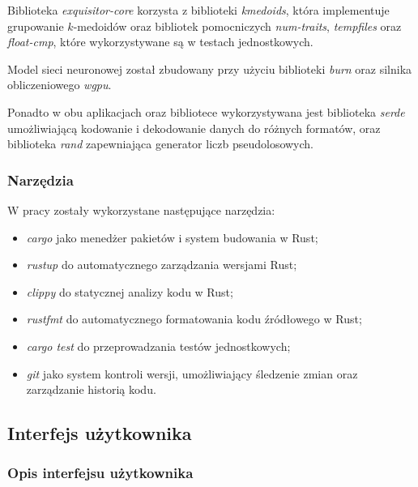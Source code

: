             Biblioteka \textit{exquisitor-core} korzysta z biblioteki \textit{kmedoids}\cite{Schubert:2022}, która implementuje grupowanie $k$-medoidów oraz bibliotek pomocniczych \textit{num-traits}, \textit{tempfiles} oraz \textit{float-cmp}, które wykorzystywane są w testach jednostkowych.

            Model sieci neuronowej został zbudowany przy użyciu biblioteki \textit{burn}\cite{Rust:burn} oraz silnika obliczeniowego \textit{wgpu}.

            Ponadto w obu aplikacjach oraz bibliotece wykorzystywana jest biblioteka \textit{serde}\cite{Rust:serde} umożliwiającą kodowanie i dekodowanie danych do różnych formatów, oraz biblioteka \textit{rand}\cite{Rust:rand} zapewniająca generator liczb pseudolosowych.

        \subsubsection{Narzędzia}
            
            W pracy zostały wykorzystane następujące narzędzia:
            \begin{itemize}
                \item \textit{cargo} jako menedżer pakietów i system budowania w Rust;
                \item \textit{rustup} do automatycznego zarządzania wersjami Rust;
                \item \textit{clippy} do statycznej analizy kodu w Rust;
                \item \textit{rustfmt} do automatycznego formatowania kodu źródłowego w Rust;
                \item \textit{cargo test} do przeprowadzania testów jednostkowych;
                \item \textit{git} jako system kontroli wersji, umożliwiający śledzenie zmian oraz zarządzanie historią kodu.
            \end{itemize}

    \subsection{Interfejs użytkownika}

        \subsubsection{Opis interfejsu użytkownika}

